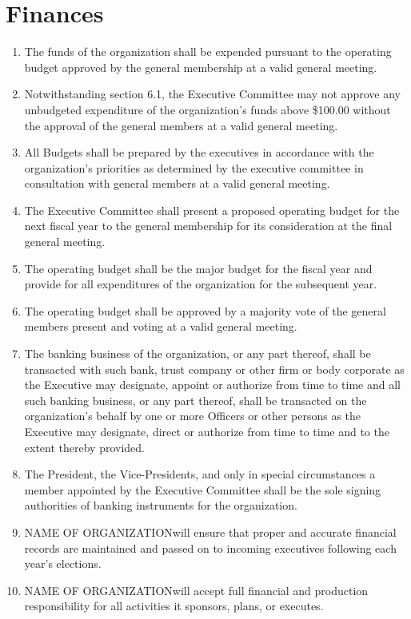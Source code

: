 \documentclass[12pt]{article}
\newcommand{\orgname}{NAME OF ORGANIZATION\space}
\begin{document}
\section{Finances}
\begin{enumerate}[{6}.1]
    \item The funds of the organization shall be expended pursuant to the operating budget approved by the general membership at a valid general meeting. 
    \item Notwithstanding section 6.1, the Executive Committee may not approve any unbudgeted expenditure of the organization’s funds above \$100.00 without the approval of the general members at a valid general meeting. 
    \item All Budgets shall be prepared by the executives in accordance with the organization’s priorities as determined by the executive committee in consultation with general members at a valid general meeting. 
    \item The Executive Committee shall present a proposed operating budget for the next fiscal year to the general membership for its consideration at the final general meeting. 
    \item The operating budget shall be the major budget for the fiscal year and provide for all expenditures of the organization for the subsequent year.
    \item The operating budget shall be approved by a majority vote of the general members present and voting at a valid general meeting. 
    \item The banking business of the organization, or any part thereof, shall be transacted with such bank, trust company or other firm or body corporate as the Executive may designate, appoint or authorize from time to time and all such banking business, or any part thereof, shall be transacted on the organization's behalf by one or more Officers or other persons as the Executive may designate, direct or authorize from time to time and to the extent thereby provided.
    \item The President, the Vice-Presidents, and only in special circumstances a member appointed by the Executive Committee shall be the sole signing authorities of banking instruments for the organization.  
    \item \orgname will ensure that proper and accurate financial records are maintained and passed on to incoming executives following each year’s elections.
    \item	\orgname will accept full financial and production responsibility for all activities it sponsors, plans, or executes.
\end{enumerate}
\end{document}
